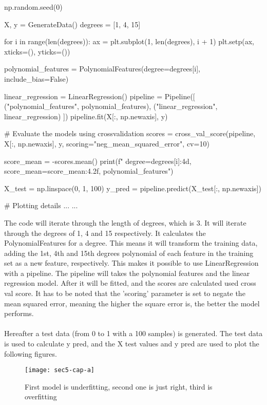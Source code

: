 \documentclass{article}
\begin{document}
\begin{pyminted}
np.random.seed(0)

X, y = GenerateData()
degrees = [1, 4, 15]

for i in range(len(degrees)):
    ax = plt.subplot(1, len(degrees), i + 1)
    plt.setp(ax, xticks=(), yticks=())

    polynomial_features = PolynomialFeatures(degree=degrees[i], include_bias=False)
    
    linear_regression = LinearRegression()
    pipeline = Pipeline([
            ("polynomial_features", polynomial_features),
            ("linear_regression", linear_regression)
        ])
    pipeline.fit(X[:, np.newaxis], y)

    # Evaluate the models using crossvalidation
    scores = cross_val_score(pipeline, X[:, np.newaxis], y, scoring="neg_mean_squared_error", cv=10)
    
    score_mean = -scores.mean()
    print(f"  degree={degrees[i]:4d}, score_mean={score_mean:4.2f},  {polynomial_features}")   

    X_test = np.linspace(0, 1, 100)
    y_pred = pipeline.predict(X_test[:, np.newaxis])
    
    # Plotting details
    ...
    ...
\end{pyminted}

The code will iterate through the length of degrees, which is 3. It will iterate through the degrees of 1, 4 and 15 respectively. It calculates the PolynomialFeatures for a degree. This means it will transform the training data, adding the 1st, 4th and 15th degrees polynomial of each feature in the training set as a new feature, respectively. This makes it possible to use LinearRegression with a pipeline. The pipeline will takes the polynomial features and the linear regression model. After it will be fitted, and the scores are calculated used cross val score. It has to be noted that the 'scoring' parameter is set to negate the mean squared error, meaning the higher the square error is, the better the model performs.
\\ \\
Hereafter a test data (from 0 to 1 with a 100 samples) is generated. The test data is used to calculate y pred, and the X test values and y pred are used to plot the following figures.

\begin{figure}[H]
  \centering
    \texttt{[image: sec5-cap-a]}
    \caption{First model is underfitting, second one is  just right, third is overfitting}
    \label{fig:cap_a}
\end{figure}
\end{document}
